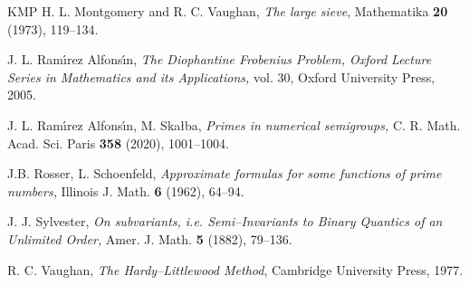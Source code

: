\documentclass[12pt,a4paper,reqno]{amsart}
\numberwithin{equation}{section}
\theoremstyle{plain}
\theoremstyle{definition}
\begin{document}
\begin{thebibliography}{KMP}
		 H. L. Montgomery and R. C. Vaughan, {\it The large sieve},  Mathematika {\bf 20} (1973), 119--134.
		
		J. L. Ram\'{\i}rez Alfons\'{\i}n, {\em The Diophantine Frobenius Problem, Oxford Lecture Series in Mathematics and its Applications,} vol. 30, Oxford University Press, 2005.
		
		J. L. Ram\'{\i}rez Alfons\'{\i}n, M. Ska{\l}ba, {\it Primes in numerical semigroups,} C. R. Math. Acad. Sci. Paris {\bf358} (2020), 1001--1004.
		
		 J.B. Rosser, L. Schoenfeld, {\it Approximate formulas for some functions of prime numbers,} Illinois J. Math. {\bf 6} (1962), 64--94.
		
		J. J. Sylvester, {\it On subvariants, i.e. Semi--Invariants to Binary Quantics of an Unlimited Order,}  Amer. J. Math. {\bf 5} (1882), 79--136.
		
		R. C. Vaughan, {\em
			The Hardy--Littlewood Method},
		Cambridge University Press, 1977.
		
		
	\end{thebibliography}
	
\end{document}
